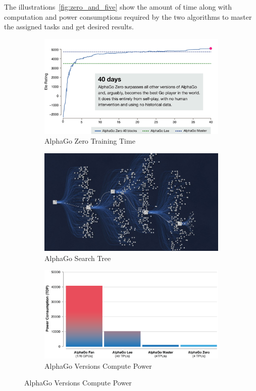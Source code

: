 The illustrations~\ref{fig:zero_and_five} show the amount of time along with computation and power consumptions required by the two algorithms to master the assigned tasks and get desired results.

\begin{figure}[H]
	\centering
	\begin{subfigure}[b]{0.3\textwidth}
		\centering
		\includegraphics[width=\textwidth]{figures/rl/alphago_zero.png}
		\caption{AlphaGo Zero Training Time}
		\label{fig:alphago_train}
    \end{subfigure}
	\hfill
	\begin{subfigure}[b]{0.3\textwidth}
		\centering
		\includegraphics[width=\textwidth]{figures/rl/alphago_search_tree.png}
        \caption{AlphaGo Search Tree}
		\label{fig:alphago_search_tree}
	\end{subfigure}
	\hfill
	\begin{subfigure}[b]{0.3\textwidth}
		\centering
		\includegraphics[width=\textwidth]{figures/rl/alphago_power.png}
        \caption{AlphaGo Versions Compute Power}
		\label{fig:alphago_power}
	\end{subfigure}
	\hfill


\end{figure}
